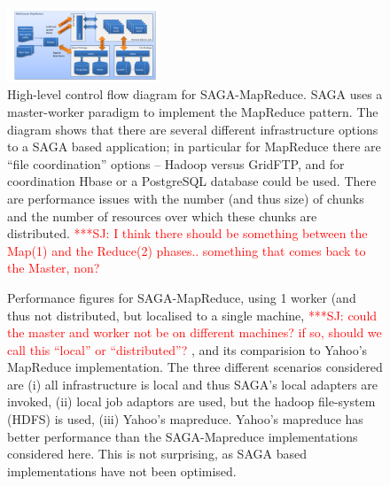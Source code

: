 \documentclass[conference,final]{IEEEtran}
\newcommand{\jhanote}[1]{ {\textcolor{red} { ***SJ: #1 }}}
\newcommand{\jhanote}[1]{}
\begin{document}
\begin{figure}[t]
      \centering
          \includegraphics[width=0.4\textwidth]{saga-mapreduce_controlflow.png}
          \caption{High-level control flow diagram for
            SAGA-MapReduce. SAGA uses a master-worker paradigm to
            implement the MapReduce pattern. The diagram shows that
            there are several different infrastructure options to a
            SAGA based application; in particular for MapReduce there
            are ``file coordination'' options -- Hadoop versus
            GridFTP, and for coordination Hbase or a PostgreSQL
            database could be used. There are performance issues with
            the number (and thus size) of chunks and the number of
            resources over which these chunks are distributed.
            \jhanote{I think there should be something between the
              Map(1) and the Reduce(2) phases.. something that comes
              back to the Master, non?}}
      \label{saga-mapreduce_controlflow.png}
\end{figure}


\begin{figure}[t]
      \centering
          \caption{Performance figures for SAGA-MapReduce, using 1
            worker (and thus not distributed, but localised to a
            single machine, \jhanote{could the master and worker not
              be on different machines? if so, should we call this
              ``local'' or ``distributed''?}, and its comparision to
            Yahoo's MapReduce implementation. The three different
            scenarios considered are (i) all infrastructure is local
            and thus SAGA's local adapters are invoked, (ii) local job
            adaptors are used, but the hadoop file-system (HDFS) is
            used, (iii) Yahoo's mapreduce. Yahoo's mapreduce has
            better performance than the SAGA-Mapreduce implementations
            considered here. This is not surprising, as SAGA based
            implementations have not been optimised.}
      \label{saga_mapreduce_1worker.png}
\end{figure}


\begin{figure}[t]
      \centering
          \caption{}
      \label{saga_mapreduce_3workers.png}
\end{figure}
\end{document}
